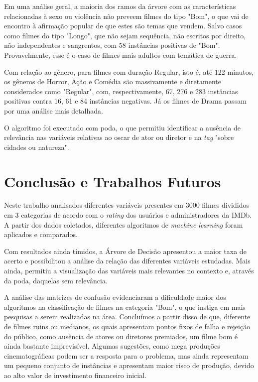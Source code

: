 \documentclass[twoside]{article}
\begin{document}
\begin{multicols}{2}
Em uma análise geral, a maioria dos ramos da árvore com as características relacionadas à sexo ou violência não preveem filmes do tipo "Bom", o que vai de encontro à afirmação popular de que estes são temas que vendem. Salvo casos como filmes do tipo "Longo", que não sejam sequência, não escritos por direito, não independentes e sangrentos, com 58 instâncias positivas de "Bom". Provavelmente, esse é o caso de filmes mais adultos com temática de guerra.

Com relação ao gênero, para filmes com duração Regular, isto é, até 122 minutos, os gêneros de Horror, Ação e Comédia são massivamente e diretamente considerados como "Regular", com, respectivamente, 67, 276 e 283 instâncias positivas contra 16, 61 e 84 instâncias negativas. Já os filmes de Drama passam por uma análise mais detalhada.

O algoritmo foi executado com poda, o que permitiu identificar a ausência de relevância nas variáveis relativas ao oscar de ator ou diretor e na \textit{tag} "sobre cidades ou natureza".

\section{Conclusão e Trabalhos Futuros}

Neste trabalho analisados diferentes variáveis presentes em 3000 filmes divididos em 3 categorias de acordo com o \textit{rating} dos usuários e administradores da IMDb. A partir dos dados coletados, diferentes algoritmos de \textit{machine learning} foram aplicados e comparados.

Com resultados ainda tímidos, a Árvore de Decisão apresentou a maior taxa de acerto e possibilitou a análise da relação das diferentes variáveis estudadas. Mais ainda, permitiu a visualização das variáveis mais relevantes no contexto e, através da poda, daquelas sem relevância.

A análise das matrizes de confusão evidenciaram a dificuldade maior dos algoritmos na classificação de filmes na categoria "Bom", o que instiga em mais pesquisas a serem realizadas na área. Concluímos a partir disso de que, diferente de filmes ruins ou medianos, os quais apresentam pontos fixos de falha e rejeição do público, como ausência de atores ou diretores premiados, um filme bom é ainda bastante imprevisível. Algumas sugestões, como mega produções cinematográficas podem ser a resposta para o problema, mas ainda representam um pequeno conjunto de instâncias e apresentam maior risco de produção, devido ao alto valor de investimento financeiro inicial.


\end{multicols}
\end{document}
